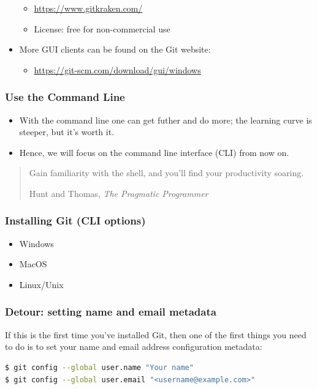 \documentclass{git_course}
\begin{document}
\begin{frame}
\begin{itemize}
        \begin{itemize}
            \item \url{https://www.gitkraken.com/}
            \item License: free for non-commercial use
        \end{itemize}
    \item More GUI clients can be found on the Git website:
        \begin{itemize}
            \item \url{https://git-scm.com/download/gui/windows}
        \end{itemize}
\end{itemize}
\end{frame}

\begin{frame}
\frametitle{Use the Command Line}
\begin{itemize}
    \item With the command line one can get futher and do more; the
        learning curve is steeper, but it's worth it.
    \item Hence, we will focus on the command line interface (CLI) from now
        on.
\end{itemize}
    \blockquote[Hunt and Thomas, \emph{The Pragmatic Programmer}]
    {Gain familiarity with the shell, and you'll find your productivity soaring.}
\end{frame}

\begin{frame}
\frametitle{Installing Git (CLI options)}
\begin{itemize}
    \item Windows
    \item MacOS
    \item Linux/Unix
\end{itemize}
\end{frame}

\begin{frame}[fragile]
    \frametitle{Detour: setting name and email metadata}
    If this is the first time you've installed Git, then one of the first
    things you need to do is to set your name and email address
    configuration metadata:
\begin{lstlisting}[language=bash]
$ git config --global user.name "Your name"
$ git config --global user.email "<username@example.com>"
\end{lstlisting}
\end{frame}
\end{document}
